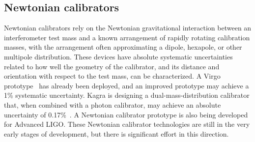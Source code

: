 \subsection{Newtonian calibrators}
Newtonian calibrators rely on the Newtonian gravitational interaction between an interferometer test mass and a known arrangement of rapidly rotating calibration masses, with the arrangement often approximating a dipole, hexapole, or other multipole distribution.
These devices have absolute systematic uncertainties related to how well the geometry of the calibrator, and its distance and orientation with respect to the test mass, can be characterized.
A Virgo prototype~\cite{0264-9381-35-23-235009} has already been deployed, and an improved prototype may achieve a 1\% systematic uncertainty.
Kagra is designing a dual-mass-distribution calibrator that, when combined with a photon calibrator, may achieve an absolute uncertainty of 0.17\%~\cite{PhysRevD.98.022005}.
A Newtonian calibrator prototype is also being developed for Advanced LIGO.
These Newtonian calibrator technologies are still in the very early stages of development, but there is significant effort in this direction.


